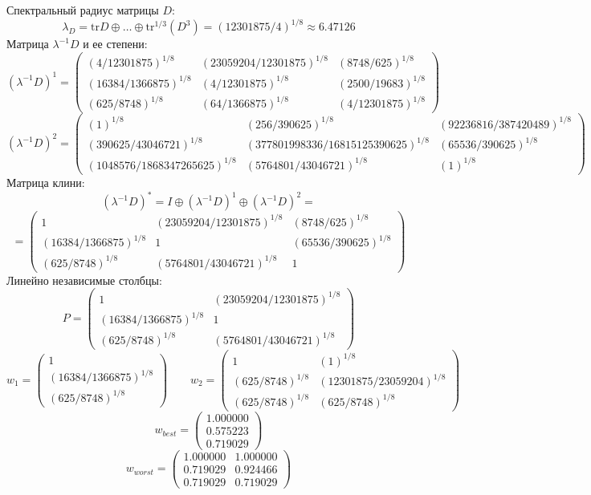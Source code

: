 Спектральный радиус матрицы $D$:
$$\lambda_{D} = \mathrm{tr}D\oplus \dots \oplus \mathrm{tr}^{1/3}(D^{3}) = (12301875/4)^{1/8} \approx 6.47126$$
Матрица $\lambda^{-1}D$ и ее степени:
$$(\lambda^{-1}D)^1 = \begin{pmatrix}
(4/12301875)^{1/8} & (23059204/12301875)^{1/8} & (8748/625)^{1/8}\\
(16384/1366875)^{1/8} & (4/12301875)^{1/8} & (2500/19683)^{1/8}\\
(625/8748)^{1/8} & (64/1366875)^{1/8} & (4/12301875)^{1/8}
\end{pmatrix}
$$
$$(\lambda^{-1}D)^2 = \begin{pmatrix}
(1)^{1/8} & (256/390625)^{1/8} & (92236816/387420489)^{1/8}\\
(390625/43046721)^{1/8} & (377801998336/16815125390625)^{1/8} & (65536/390625)^{1/8}\\
(1048576/1868347265625)^{1/8} & (5764801/43046721)^{1/8} & (1)^{1/8}
\end{pmatrix}
$$
Матрица клини:
$$(\lambda^{-1}D)^* = I \oplus (\lambda^{-1}D)^1 \oplus (\lambda^{-1}D)^2 = $$
$$ = \begin{pmatrix}
1 & (23059204/12301875)^{1/8} & (8748/625)^{1/8}\\
(16384/1366875)^{1/8} & 1 & (65536/390625)^{1/8}\\
(625/8748)^{1/8} & (5764801/43046721)^{1/8} & 1
\end{pmatrix}
$$
Линейно независимые столбцы:
$$P = \begin{pmatrix}
1 & (23059204/12301875)^{1/8}\\
(16384/1366875)^{1/8} & 1\\
(625/8748)^{1/8} & (5764801/43046721)^{1/8}
\end{pmatrix}
$$
$$w_1 = \begin{pmatrix}
1\\
(16384/1366875)^{1/8}\\
(625/8748)^{1/8}
\end{pmatrix}
\qquad w_2 = \begin{pmatrix}
1 & (1)^{1/8}\\
(625/8748)^{1/8} & (12301875/23059204)^{1/8}\\
(625/8748)^{1/8} & (625/8748)^{1/8}
\end{pmatrix}
$$
$$w_{best} = \begin{pmatrix}
1.000000\\
0.575223\\
0.719029
\end{pmatrix}
$$
$$w_{worst} = \begin{pmatrix}
1.000000 & 1.000000\\
0.719029 & 0.924466\\
0.719029 & 0.719029
\end{pmatrix}
$$
